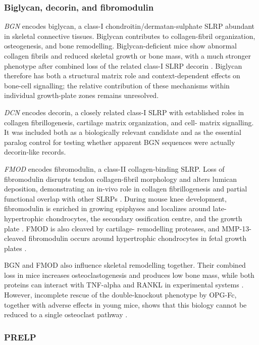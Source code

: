 \subsubsection{Biglycan, decorin, and fibromodulin}

\textit{BGN} encodes biglycan, a class-I chondroitin/dermatan-sulphate SLRP
abundant in skeletal connective tissues. Biglycan contributes to collagen-fibril
organization, osteogenesis, and bone remodelling. Biglycan-deficient mice show
abnormal collagen fibrils and reduced skeletal growth or bone mass, with a much
stronger phenotype after combined loss of the related class-I SLRP decorin
\citep{Corsi2002}. Biglycan therefore has both a structural matrix role and
context-dependent effects on bone-cell signalling; the relative contribution of
these mechanisms within individual growth-plate zones remains unresolved.

\textit{DCN} encodes decorin, a closely related class-I SLRP with established
roles in collagen fibrillogenesis, cartilage matrix organization, and cell-
matrix signalling. It was included both as a biologically relevant candidate
and as the essential paralog control for testing whether apparent BGN sequences
were actually decorin-like records.

\textit{FMOD} encodes fibromodulin, a class-II collagen-binding SLRP. Loss of
fibromodulin disrupts tendon collagen-fibril morphology and alters lumican
deposition, demonstrating an in-vivo role in collagen fibrillogenesis and
partial functional overlap with other SLRPs \citep{Svensson1999}. During mouse
knee development, fibromodulin is enriched in growing epiphyses and localizes
around late-hypertrophic chondrocytes, the secondary ossification centre, and
the growth plate \citep{Saamanen2001}. FMOD is also cleaved by cartilage-
remodelling proteases, and MMP-13-cleaved fibromodulin occurs around
hypertrophic chondrocytes in fetal growth plates \citep{Shu2019}.

BGN and FMOD also influence skeletal remodelling together. Their combined loss
in mice increases osteoclastogenesis and produces low bone mass, while both
proteins can interact with TNF-alpha and RANKL in experimental systems
\citep{Kram2017}. However, incomplete rescue of the double-knockout phenotype by
OPG-Fc, together with adverse effects in young mice, shows that this biology
cannot be reduced to a single osteoclast pathway \citep{Kram2020}.

\subsubsection{PRELP}

